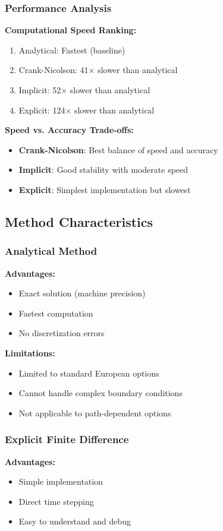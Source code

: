 \documentclass[12pt,a4paper]{article}
\numberwithin{algorithm}{subsection}
\begin{document}
\subsubsection{Performance Analysis}

\textbf{Computational Speed Ranking:}
\begin{enumerate}
\item Analytical: Fastest (baseline)
\item Crank-Nicolson: 41× slower than analytical
\item Implicit: 52× slower than analytical  
\item Explicit: 124× slower than analytical
\end{enumerate}

\textbf{Speed vs. Accuracy Trade-offs:}
\begin{itemize}
\item \textbf{Crank-Nicolson}: Best balance of speed and accuracy
\item \textbf{Implicit}: Good stability with moderate speed
\item \textbf{Explicit}: Simplest implementation but slowest
\end{itemize}

\subsection{Method Characteristics}

\subsubsection{Analytical Method}
\textbf{Advantages:}
\begin{itemize}
\item Exact solution (machine precision)
\item Fastest computation
\item No discretization errors
\end{itemize}

\textbf{Limitations:}
\begin{itemize}
\item Limited to standard European options
\item Cannot handle complex boundary conditions
\item Not applicable to path-dependent options
\end{itemize}

\subsubsection{Explicit Finite Difference}
\textbf{Advantages:}
\begin{itemize}
\item Simple implementation
\item Direct time stepping
\item Easy to understand and debug
\end{itemize}
\end{document}

